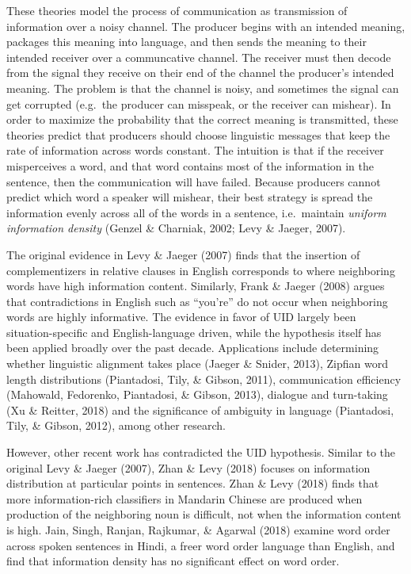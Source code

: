 \documentclass[10pt, letterpaper]{article}
\begin{document}
These theories model the process of communication as transmission of
information over a noisy channel. The producer begins with an intended
meaning, packages this meaning into language, and then sends the meaning
to their intended receiver over a communcative channel. The receiver
must then decode from the signal they receive on their end of the
channel the producer's intended meaning. The problem is that the channel
is noisy, and sometimes the signal can get corrupted (e.g.~the producer
can misspeak, or the receiver can mishear). In order to maximize the
probability that the correct meaning is transmitted, these theories
predict that producers should choose linguistic messages that keep the
rate of information across words constant. The intuition is that if the
receiver misperceives a word, and that word contains most of the
information in the sentence, then the communication will have failed.
Because producers cannot predict which word a speaker will mishear,
their best strategy is spread the information evenly across all of the
words in a sentence, i.e.~maintain \emph{uniform information density}
(Genzel \& Charniak, 2002; Levy \& Jaeger, 2007).

The original evidence in Levy \& Jaeger (2007) finds that the insertion
of complementizers in relative clauses in English corresponds to where
neighboring words have high information content. Similarly, Frank \&
Jaeger (2008) argues that contradictions in English such as ``you're''
do not occur when neighboring words are highly informative. The evidence
in favor of UID largely been situation-specific and English-language
driven, while the hypothesis itself has been applied broadly over the
past decade. Applications include determining whether linguistic
alignment takes place (Jaeger \& Snider, 2013), Zipfian word length
distributions (Piantadosi, Tily, \& Gibson, 2011), communication
efficiency (Mahowald, Fedorenko, Piantadosi, \& Gibson, 2013), dialogue
and turn-taking (Xu \& Reitter, 2018) and the significance of ambiguity
in language (Piantadosi, Tily, \& Gibson, 2012), among other research.

However, other recent work has contradicted the UID hypothesis. Similar
to the original Levy \& Jaeger (2007), Zhan \& Levy (2018) focuses on
information distribution at particular points in sentences. Zhan \& Levy
(2018) finds that more information-rich classifiers in Mandarin Chinese
are produced when production of the neighboring noun is difficult, not
when the information content is high. Jain, Singh, Ranjan, Rajkumar, \&
Agarwal (2018) examine word order across spoken sentences in Hindi, a
freer word order language than English, and find that information
density has no significant effect on word order.
\end{document}
